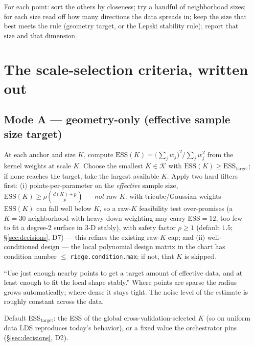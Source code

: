 \documentclass[11pt]{article}
\newcommand{\code}[1]{\texttt{#1}}
\begin{document}
\begin{plain}
For each point: sort the others by closeness; try a handful of neighborhood sizes;
for each size read off how many directions the data spreads in; keep the size that
best meets the rule (geometry target, or the Lepski stability rule); report that size and
that dimension.
\end{plain}

\section{The scale-selection criteria, written out}\label{sec:criteria}

\subsection{Mode A --- geometry-only (effective sample size target)}
At each anchor and size $K$, compute $\mathrm{ESS}(K)=\big(\sum_j w_j\big)^2/\sum_j w_j^2$
from the kernel weights at scale $K$. Choose the smallest $K\in\mathcal{K}$ with
$\mathrm{ESS}(K)\ge \mathrm{ESS}_{\text{target}}$; if none reaches the target, take
the largest available $K$. Apply two hard filters first: (i) points-per-parameter on the
\emph{effective} sample size, $\mathrm{ESS}(K)\ge \rho\binom{d(K)+p}{p}$ --- \emph{not} raw
$K$: with tricube/Gaussian weights $\mathrm{ESS}(K)$ can fall well below $K$, so a raw-$K$
feasibility test over-promises (a $K=30$ neighborhood with heavy down-weighting may carry
$\mathrm{ESS}=12$, too few to fit a degree-2 surface in 3-D stably), with safety factor
$\rho\ge1$ (default $1.5$; \S\ref{sec:decisions}, D7) --- this refines the existing raw-$K$
cap; and (ii) well-conditioned design --- the local polynomial design matrix in the chart
has condition number $\le$ \code{ridge.condition.max}; if not, that $K$ is skipped.

\begin{plain}
``Use just enough nearby points to get a target amount of effective data, and at
least enough to fit the local shape stably.'' Where points are sparse the radius
grows automatically; where dense it stays tight. The noise level of the estimate is
roughly constant across the data.
\end{plain}

\noindent Default $\mathrm{ESS}_{\text{target}}$: the ESS of the global
cross-validation-selected $K$ (so on uniform data LDS reproduces today's behavior),
or a fixed value the orchestrator pins (\S\ref{sec:decisions}, D2).
\end{document}
